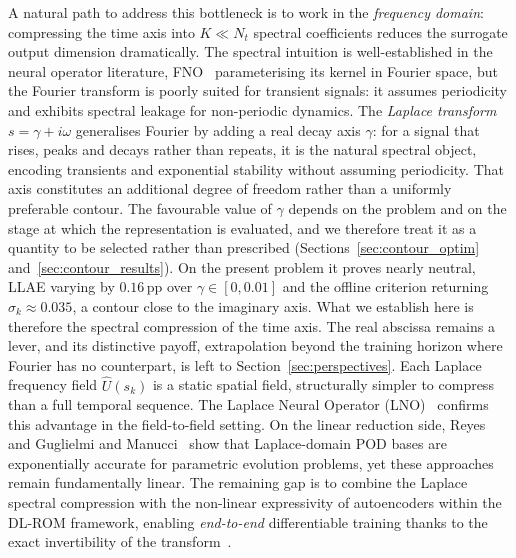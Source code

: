 ﻿\documentclass[a4paper,12pt]{article}
\theoremstyle{definition}
\theoremstyle{remark}
\begin{document}
A natural path to address this bottleneck is to work in the \emph{frequency domain}: compressing the time axis into $K \ll N_t$ spectral coefficients reduces the surrogate output dimension dramatically. The spectral intuition is well-established in the neural operator literature, FNO~\cite{li2021fno} parameterising its kernel in Fourier space, but the Fourier transform is poorly suited for transient signals: it assumes periodicity and exhibits spectral leakage for non-periodic dynamics. The \emph{Laplace transform} $s = \gamma + i\omega$ generalises Fourier by adding a real decay axis $\gamma$: for a signal that rises, peaks and decays rather than repeats, it is the natural spectral object, encoding transients and exponential stability without assuming periodicity. That axis constitutes an additional degree of freedom rather than a uniformly preferable contour. The favourable value of $\gamma$ depends on the problem and on the stage at which the representation is evaluated, and we therefore treat it as a quantity to be selected rather than prescribed (Sections~\ref{sec:contour_optim} and~\ref{sec:contour_results}). On the present problem it proves nearly neutral, LLAE varying by $0.16$\,pp over $\gamma \in [0, 0.01]$ and the offline criterion returning $\sigma_k \approx 0.035$, a contour close to the imaginary axis. What we establish here is therefore the spectral compression of the time axis. The real abscissa remains a lever, and its distinctive payoff, extrapolation beyond the training horizon where Fourier has no counterpart, is left to Section~\ref{sec:perspectives}. Each Laplace frequency field $\hat{U}(s_k)$ is a static spatial field, structurally simpler to compress than a full temporal sequence. The Laplace Neural Operator (LNO)~\cite{cao2023} confirms this advantage in the field-to-field setting. On the linear reduction side, Reyes~\cite{reyes2025} and Guglielmi and Manucci~\cite{guglielmi2023} show that Laplace-domain POD bases are exponentially accurate for parametric evolution problems, yet these approaches remain fundamentally linear. The remaining gap is to combine the Laplace spectral compression with the non-linear expressivity of autoencoders within the DL-ROM framework, enabling \emph{end-to-end} differentiable training thanks to the exact invertibility of the transform~\cite{guglielmi2020}.
\end{document}
